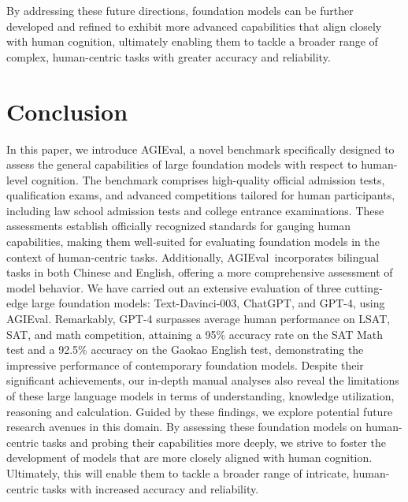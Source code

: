 By addressing these future directions, foundation models can be further developed and refined to exhibit more advanced capabilities that align closely with human cognition, ultimately enabling them to tackle a broader range of complex, human-centric tasks with greater accuracy and reliability.

\section{Conclusion}

In this paper, we introduce {AGIEval}, a novel benchmark specifically designed to assess the general capabilities of large foundation models with respect to human-level cognition. The benchmark comprises high-quality official admission tests, qualification exams, and advanced competitions tailored for human participants, including law school admission tests and college entrance examinations. These assessments establish officially recognized standards for gauging human capabilities, making them well-suited for evaluating foundation models in the context of human-centric tasks. Additionally, {AGIEval}~incorporates bilingual tasks in both Chinese and English, offering a more comprehensive assessment of model behavior. We have carried out an extensive evaluation of three cutting-edge large foundation models: Text-Davinci-003, ChatGPT, and GPT-4, using {AGIEval}. Remarkably, GPT-4 surpasses average human performance on LSAT, SAT, and math competition, attaining a 95\% accuracy rate on the SAT Math test and a 92.5\% accuracy on the Gaokao English test, demonstrating the impressive performance of contemporary foundation models. Despite their significant achievements, our in-depth manual analyses also reveal the limitations of these large language models in terms of understanding, knowledge utilization, reasoning and calculation. Guided by these findings, we explore potential future research avenues in this domain. By assessing these foundation models on human-centric tasks and probing their capabilities more deeply, we strive to foster the development of models that are more closely aligned with human cognition. Ultimately, this will enable them to tackle a broader range of intricate, human-centric tasks with increased accuracy and reliability.


